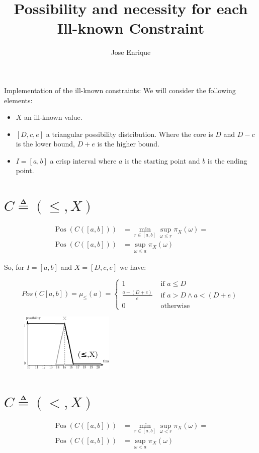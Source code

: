 \documentclass[10pt,a4paper]{article}
\author{Jose Enrique}
\title{Possibility and necessity for each Ill-known Constraint}
\newcommand{\Pos}{\operatorname{Pos}}
\begin{document}
Implementation of the ill-known constraints:
We will consider the following elements:
\begin{itemize}
\item $X$ an ill-known value.
\item $[D,c,e]$ a triangular possibility distribution. Where the core is $D$ and $D-c$ is the lower bound, $D+e$ is the higher bound.
\item $I = [a, b]$ a crisp interval where $a$ is the starting point and $b$ is the ending point.
\end{itemize}


\section*{$C\triangleq(\leq,X)$}
\begin{align}
\Pos (C([a,b])) &= \min_{r \in [a,b]} \sup_{\omega \leq r} \pi_X(\omega) = \\
\Pos (C([a,b])) &= \sup_{\omega \leq a} \pi_X(\omega)
\end{align}

So, for $I=[a,b]$ and  $X=[D,c,e]$ we have:

\begin{equation}
Pos (C[a,b]) = \mu_{\leq}(a) =
\begin{cases}
1 & \mbox{ if } a \leq D \\
\frac{a-(D+e)}{e} & \mbox{ if } a > D \wedge a < (D+e) \\
0 & \mbox{ otherwise }
\end{cases}
\end{equation}


\begin{figure}[h]
\centering
\includegraphics[scale=1]{graphs/lte.pdf}
\end{figure}



\section*{$C\triangleq(<,X)$}
\begin{align}
\Pos (C([a,b])) &= \min_{r \in [a,b]} \sup_{\omega < r} \pi_X(\omega) = \\
\Pos (C([a,b])) &= \sup_{\omega < a} \pi_X(\omega)
\end{align}
\end{document}
